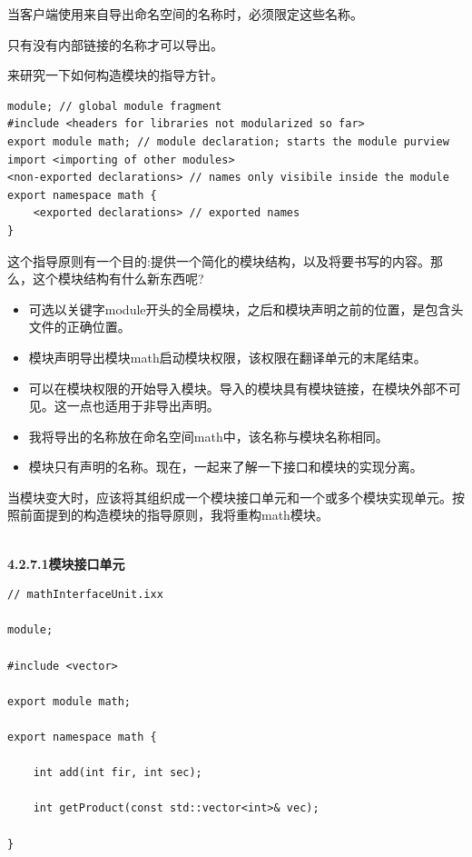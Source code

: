 当客户端使用来自导出命名空间的名称时，必须限定这些名称。

只有没有内部链接的名称才可以导出。


来研究一下如何构造模块的指导方针。

\begin{lstlisting}[style=styleCXX]
module; // global module fragment
#include <headers for libraries not modularized so far>
export module math; // module declaration; starts the module purview
import <importing of other modules>
<non-exported declarations> // names only visibile inside the module
export namespace math {
	<exported declarations> // exported names
}
\end{lstlisting}

这个指导原则有一个目的:提供一个简化的模块结构，以及将要书写的内容。那么，这个模块结构有什么新东西呢?

\begin{itemize}
\item 
可选以关键字module开头的全局模块，之后和模块声明之前的位置，是包含头文件的正确位置。

\item 
模块声明导出模块math启动模块权限，该权限在翻译单元的末尾结束。

\item 
可以在模块权限的开始导入模块。导入的模块具有模块链接，在模块外部不可见。这一点也适用于非导出声明。

\item 
我将导出的名称放在命名空间math中，该名称与模块名称相同。

\item 
模块只有声明的名称。现在，一起来了解一下接口和模块的实现分离。
\end{itemize}


当模块变大时，应该将其组织成一个模块接口单元和一个或多个模块实现单元。按照前面提到的构造模块的指导原则，我将重构math模块。

\hspace*{\fill} \\ %
\noindent
\textbf{4.2.7.1\hspace{0.2cm}模块接口单元}

\begin{lstlisting}[style=styleCXX]
// mathInterfaceUnit.ixx

module;

#include <vector>

export module math;

export namespace math {

	int add(int fir, int sec);
	
	int getProduct(const std::vector<int>& vec);

}
\end{lstlisting}

